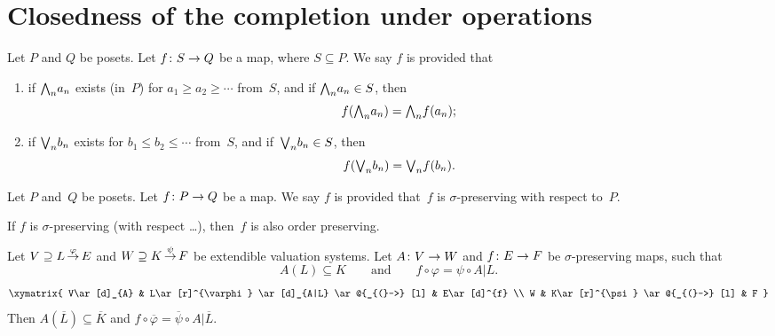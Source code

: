 \documentclass[main.tex]{subfiles}
\begin{document}
\section{Closedness of the completion under operations}
%
%
\begin{dfn}
\label{D:sigma-preserving}
Let $P$ and $Q$ be posets.
Let $f\colon S\rightarrow Q$ be a map, where $S\subseteq P$.
We say $f$ is 
provided that
\begin{enumerate}
\item
if 
$\textstyle{\bigwedge}_n{a_n}$ exists
(in~$P$)
for
$a_1 \geq a_2 \geq \dotsb$
from~$S$,
and if $\textstyle{\bigwedge}_n a_n\in S$,
then 
\begin{equation*}
f(\textstyle{\bigwedge}_n a_n) = \textstyle{\bigwedge}_n f(a_n);
\end{equation*}

\item
if 
$\textstyle{\bigvee}_n{b_n}$ exists
for
$b_1 \leq b_2 \leq \dotsb$
from~$S$,
and if~$\textstyle{\bigvee}_n b_n\in S$,
then 
\begin{equation*}
f(\textstyle{\bigvee}_n b_n) = \textstyle{\bigvee}_n f(b_n).
\end{equation*}
\end{enumerate}
Let $P$ and~$Q$ be posets. Let $f\colon P \rightarrow Q$ be a map.
We say $f$ is 
provided that~$f$ is $\sigma$-preserving with respect to~$P$.
\end{dfn}
\begin{rem}
If $f$ is $\sigma$-preserving
(with respect \ldots),
then~$f$ is also order preserving.
\end{rem}
%
%
\begin{thm}
\label{T:ext1}
Let $V \supseteq L\,\smash{\stackrel{\varphi}{\rightarrow}}\,E$ and
 $W \supseteq K\,\smash{\stackrel{\psi}{\rightarrow}}\,F$ be extendible valuation systems.
Let
$A\colon V\rightarrow W$
and 
$f\colon E\rightarrow F$ be $\sigma$-preserving maps,
such that 
\begin{equation*}
A(L)\subseteq K
\qquad\text{and}\qquad
f \circ \varphi = \psi \circ A|L.
\end{equation*}
\begin{equation*}
\xymatrix{
V\ar[d]_{A} & 
  L\ar[r]^{\varphi} \ar[d]_{A|L} \ar @{_{(}->} [l] & 
  E\ar[d]^{f} \\
W &
  K\ar[r]^{\psi} \ar @{_{(}->} [l] & 
  F
}\end{equation*}
Then $A(\overline{L})\subseteq \overline{K}$
and $f \circ \overline\varphi = \overline\psi\circ A|\overline L$.
\end{thm}
\end{document}
